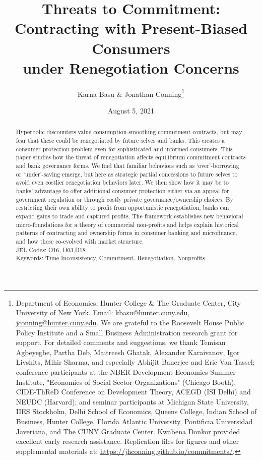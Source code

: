 \documentclass[11pt,english]{article}
\date{August 5, 2021}\usepackage{babel}
\theoremstyle{plain}
\theoremstyle{definition}
\begin{document}

\title{Threats to Commitment:\\Contracting with Present-Biased Consumers\\under Renegotiation Concerns}

\author{Karna Basu \& Jonathan Conning\thanks{Department of Economics, Hunter College \& The Graduate Center, City
University of New York. Email: \href{mailto:kbasu@hunter.cuny.edu}{kbasu@hunter.cuny.edu}, \href{mailto:jconning@hunter.cuny.edu}{jconning@hunter.cuny.edu}.
We are grateful to the Roosevelt House Public Policy Institute and
a Small Business Administration research grant for support. For detailed
comments and suggestions, we thank Temisan Agbeyegbe, Partha Deb, Maitreesh Ghatak, Alexander Karaivanov, Igor Livshits, Mihir Sharma, and especially Abhijit Banerjee and Eric Van Tassel; conference participants at the NBER Development
Economics Summer Institute, "Economics of Social Sector Organizations"
(Chicago Booth), CIDE-ThReD Conference on Development Theory, ACEGD
(ISI Delhi) and NEUDC (Harvard); and seminar participants
at Michigan State University, IIES Stockholm, Delhi School of Economics,
Queens College, Indian School of Business, Hunter College, Florida
Atlantic University, Pontificia Universidad Javeriana, and The CUNY Graduate
Center. Kwabena Donkor provided excellent early research assistance.
Replication files for figures and other supplemental materials at:
\protect\url{https://jhconning.github.io/commitments/}.}}




\maketitle

\begin{abstract}
Hyperbolic discounters value consumption-smoothing commitment contracts, but may fear that these could be renegotiated by future selves and banks. This creates a consumer protection problem even for sophisticated and informed consumers. This paper studies how the threat of renegotiation affects equilibrium commitment contracts and bank governance forms. We find that familiar behaviors such as `over'-borrowing or `under'-saving emerge, but here as strategic partial concessions to future selves to avoid even costlier renegotiation behaviors later. We then show how it may be to banks' advantage to offer additional consumer protection either via an appeal for government regulation or through costly private governance/ownership choices. By restricting their own ability to profit from opportunistic renegotiation, banks can expand gains to trade and captured profits. The framework establishes new behavioral micro-foundations for a theory of commercial non-profits and helps explain historical patterns of contracting and ownership forms in consumer banking and microfinance, and how these co-evolved with market structure.   
\\JEL Codes: O16, D03,D18 
\\Keywords: Time-Inconsistency, Commitment, Renegotiation, Nonprofits
\end{abstract}
\vspace{\baselineskip}
\end{document}

